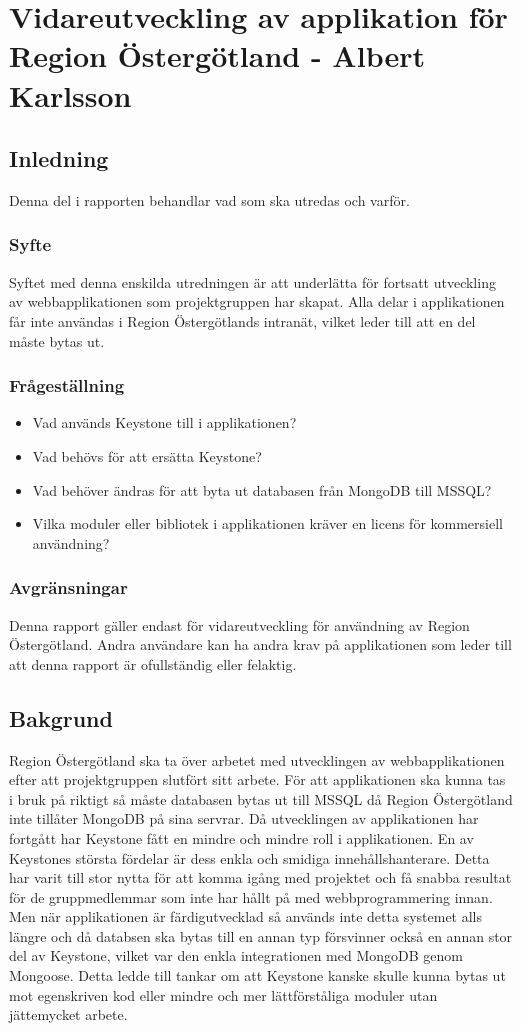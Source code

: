 \section{Vidareutveckling av applikation för Region Östergötland - Albert Karlsson}
\subsection{Inledning}
Denna del i rapporten behandlar vad som ska utredas och varför.
\subsubsection{Syfte}
Syftet med denna enskilda utredningen är att underlätta för fortsatt utveckling av webbapplikationen som projektgruppen har skapat. Alla delar i applikationen får inte användas i Region Östergötlands intranät, vilket leder till att en del måste bytas ut.
\subsubsection{Frågeställning}
\begin{itemize}
\item Vad används Keystone till i applikationen?
\item Vad behövs för att ersätta Keystone?
\item Vad behöver ändras för att byta ut databasen från MongoDB till MSSQL?
\item Vilka moduler eller bibliotek i applikationen kräver en licens för kommersiell användning?

\end{itemize}
\subsubsection{Avgränsningar}
Denna rapport gäller endast för vidareutveckling för användning av Region Östergötland. Andra användare kan ha andra krav på applikationen som leder till att denna rapport är ofullständig eller felaktig. 
\subsection{Bakgrund}
Region Östergötland ska ta över arbetet med utvecklingen av webbapplikationen efter att projektgruppen slutfört sitt arbete. För att applikationen ska kunna tas i bruk på riktigt så måste databasen bytas ut till MSSQL då Region Östergötland inte tillåter MongoDB på sina servrar. Då utvecklingen av applikationen har fortgått har Keystone fått en mindre och mindre roll i applikationen. En av Keystones största fördelar är dess enkla och smidiga innehållshanterare. Detta har varit till stor nytta för att komma igång med projektet och få snabba resultat för de gruppmedlemmar som inte har hållt på med webbprogrammering innan. Men när applikationen är färdigutvecklad så används inte detta systemet alls längre och då databsen ska bytas till en annan typ försvinner också en annan stor del av Keystone, vilket var den enkla integrationen med MongoDB genom Mongoose. Detta ledde till tankar om att Keystone kanske skulle kunna bytas ut mot egenskriven kod eller mindre och mer lättförståliga moduler utan jättemycket arbete.
